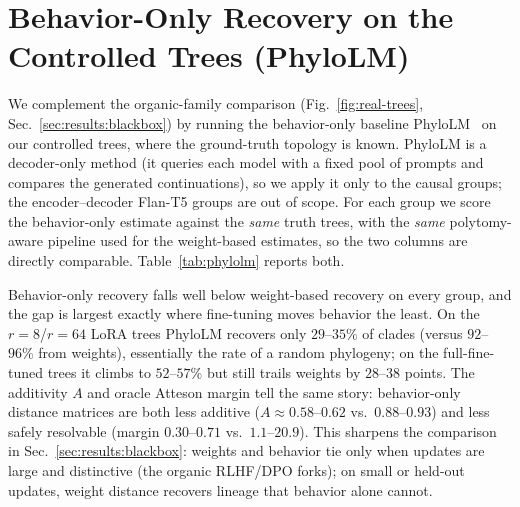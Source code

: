 \documentclass{article}
\theoremstyle{definition}
\theoremstyle{plain}
\begin{document}
\section{Behavior-Only Recovery on the Controlled Trees (PhyloLM)}
\label{app:phylolm}

We complement the organic-family comparison (Fig.~\ref{fig:real-trees},
Sec.~\ref{sec:results:blackbox}) by running the behavior-only baseline PhyloLM~\citep{yax2025phylolm}
on our controlled trees, where the ground-truth topology is known. PhyloLM is a decoder-only method
(it queries each model with a fixed pool of prompts and compares the generated continuations), so we
apply it only to the causal groups; the encoder--decoder Flan-T5 groups are out of scope. For each
group we score the behavior-only estimate against the \emph{same} truth trees, with the \emph{same}
polytomy-aware pipeline used for the weight-based estimates, so the two columns are directly
comparable. Table~\ref{tab:phylolm} reports both.

Behavior-only recovery falls well below weight-based recovery on every group, and the gap is largest
exactly where fine-tuning moves behavior the least. On the $r{=}8$/$r{=}64$ LoRA trees PhyloLM
recovers only $29$--$35\%$ of clades (versus $92$--$96\%$ from weights), essentially the rate of a
random phylogeny; on the full-fine-tuned trees it climbs to $52$--$57\%$ but still trails weights by
$28$--$38$ points. The additivity $A$ and oracle Atteson margin tell the same story: behavior-only
distance matrices are both less additive ($A\approx 0.58$--$0.62$ vs.\ $0.88$--$0.93$) and less safely
resolvable (margin $0.30$--$0.71$ vs.\ $1.1$--$20.9$). This sharpens the comparison in
Sec.~\ref{sec:results:blackbox}: weights and behavior tie only when updates are large and distinctive
(the organic RLHF/DPO forks); on small or held-out updates, weight distance recovers lineage that
behavior alone cannot.
\end{document}
